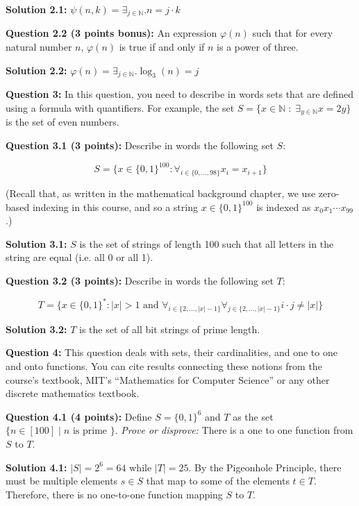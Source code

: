 \documentclass[11pt]{article}
\begin{document}
\textbf{Solution 2.1:}
$\psi(n,k) = \exists_{j \in \mathbb{N}}. n = j \cdot k$

\textbf{Question 2.2 (3 points bonus):} An expression \(\varphi(n)\)
such that for every natural number \(n\), \(\varphi(n)\) is true if and
only if \(n\) is a power of three.

\textbf{Solution 2.2:}
$\varphi(n) = \exists_{j \in \mathbb{N}}. \log_{3}(n) = j$

\newpage

\textbf{Question 3:} In this question, you need to describe in words
sets that are defined using a formula with quantifiers. For example, the
set \(S = \{ x\in \mathbb{N} \;:\; \exists_{y\in\mathbb{N}} x=2y \}\) is
the set of even numbers.

\textbf{Question 3.1 (3 points):} Describe in words the following set
\(S\):

\[
S = \{ x\in \{0,1\}^{100} : \forall_{i\in \{0,\ldots, 98\}} x_i = x_{i+1} \}
\]

(Recall that, as written in the mathematical background chapter, we use
zero-based indexing in this course, and so a string
\(x\in \{0,1\}^{100}\) is indexed as \(x_0x_1\cdots x_{99}\).)

\textbf{Solution 3.1:} $S$ is the set of strings of length 100 such that all letters
in the string are equal (i.e. all 0 or all 1).

\textbf{Question 3.2 (3 points):} Describe in words the following set
\(T\):

\[
T = \{ x\in \{0,1\}^* : |x|>1 \mbox{ and } \forall_{i \in \{2,\ldots,|x|-1 \} } \forall_{j \in \{2,\ldots,|x|-1\}} i\cdot j \neq |x| \}
\]

\textbf{Solution 3.2:} $T$ is the set of all bit strings of prime length.

\newpage

\textbf{Question 4:} This question deals with sets, their cardinalities,
and one to one and onto functions. You can cite results connecting these
notions from the course's textbook, MIT's ``Mathematics for Computer
Science'' or any other discrete mathematics textbook.

\textbf{Question 4.1 (4 points):} Define \(S = \{0,1\}^6\) and \(T\) as
the set \(\{ n \in [100] \;|\; \mbox{$n$ is prime } \}\). \emph{Prove or
disprove:} There is a one to one function from \(S\) to \(T\).

\textbf{Solution 4.1:}
$|S| = 2^6 = 64$ while $|T| = 25$. By the Pigeonhole Principle, there must be multiple 
elements $s \in S$ that map to some of the elements $t \in T$. Therefore, there is no
one-to-one function mapping $S$ to $T$.
\end{document}
